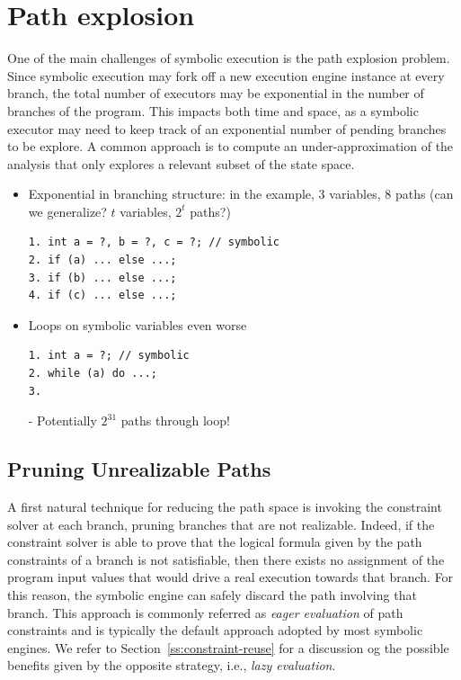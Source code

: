 
\section{Path explosion}
\label{se:path-explosion}

One of the main challenges of symbolic execution is the path explosion problem. Since symbolic execution may fork off a new execution engine instance at every branch, the total number of executors may be exponential in the number of branches of the program. This impacts both time and space, as a symbolic executor may need to keep track of an exponential number of pending branches to be explore. A common approach is to compute an under-approximation of the analysis that only explores a relevant subset of the state space.

\begin{itemize}

\item Exponential in branching structure: in the example, 3 variables, 8 paths (can we generalize? $t$ variables, $2^t$ paths?)

\begin{verbatim}
1. int a = ?, b = ?, c = ?; // symbolic
2. if (a) ... else ...;
3. if (b) ... else ...;
4. if (c) ... else ...;
\end{verbatim}

\item Loops on symbolic variables even worse

\begin{verbatim}
1. int a = ?; // symbolic
2. while (a) do ...;
3.
\end{verbatim}
- Potentially $2^{31}$ paths through loop!

\end{itemize}

\subsection{Pruning Unrealizable Paths}
\label{ss:unrealizable-paths}

A first natural technique for reducing the path space is invoking the constraint solver at each branch, pruning branches that are not realizable. Indeed, if the constraint solver is able to prove that the logical formula given by the path constraints of a branch is not satisfiable, then there exists no assignment of the program input values that would drive a real execution towards that branch. For this reason, the symbolic engine can safely discard the path involving that branch. This approach is commonly referred as {\em eager evaluation} of path constraints and is typically the default approach adopted by most symbolic engines. We refer to Section~\ref{ss:constraint-reuse} for a discussion og the possible benefits given by the opposite strategy, i.e., {\em lazy evaluation}.

